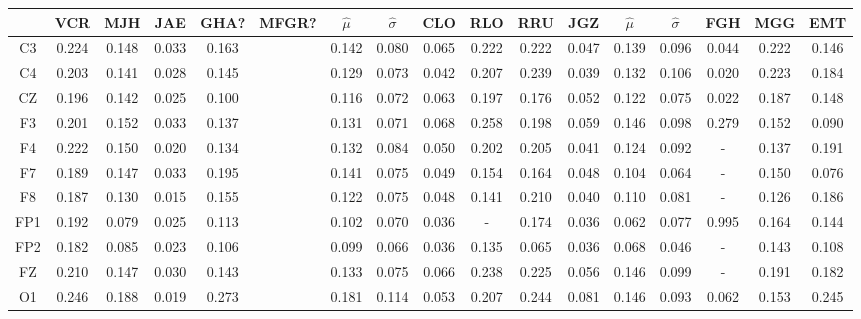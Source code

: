 \begin{SidewaysFigure}
\centering
\begin{tabular}{c||ccccc|cc||cccc|cc||ccc}
& VCR & MJH & JAE & GHA? & MFGR? &$\widehat{\mu}$ & $\widehat{\sigma}$
& CLO & RLO & RRU & JGZ &$\widehat{\mu}$ & $\widehat{\sigma}$
& FGH & MGG & EMT \\
\hline
 C3 & 0.224    & 0.148    & 0.033    & 0.163    && 0.142    & 0.080    & 0.065    & 0.222    & 0.222    & 0.047    & 0.139    & 0.096    & 0.044    & 0.222    & 0.146    \\
 C4 & 0.203    & 0.141    & 0.028    & 0.145    && 0.129    & 0.073    & 0.042    & 0.207    & 0.239    & 0.039    & 0.132    & 0.106    & 0.020    & 0.223    & 0.184    \\
 CZ & 0.196    & 0.142    & 0.025    & 0.100    && 0.116    & 0.072    & 0.063    & 0.197    & 0.176    & 0.052    & 0.122    & 0.075    & 0.022    & 0.187    & 0.148    \\
 F3 & 0.201    & 0.152    & 0.033    & 0.137    && 0.131    & 0.071    & 0.068    & 0.258    & 0.198    & 0.059    & 0.146    & 0.098    & 0.279    & 0.152    & 0.090    \\
 F4 & 0.222    & 0.150    & 0.020    & 0.134    && 0.132    & 0.084    & 0.050    & 0.202    & 0.205    & 0.041    & 0.124    & 0.092    & -      & 0.137    & 0.191    \\
 F7 & 0.189    & 0.147    & 0.033    & 0.195    && 0.141    & 0.075    & 0.049    & 0.154    & 0.164    & 0.048    & 0.104    & 0.064    & -      & 0.150    & 0.076    \\
 F8 & 0.187    & 0.130    & 0.015    & 0.155    && 0.122    & 0.075    & 0.048    & 0.141    & 0.210    & 0.040    & 0.110    & 0.081    & -      & 0.126    & 0.186    \\
 FP1 & 0.192    & 0.079    & 0.025    & 0.113    && 0.102    & 0.070    & 0.036    & -      & 0.174    & 0.036    & 0.062    & 0.077    & 0.995    & 0.164    & 0.144    \\
 FP2 & 0.182    & 0.085    & 0.023    & 0.106    && 0.099    & 0.066    & 0.036    & 0.135    & 0.065    & 0.036    & 0.068    & 0.046    & -      & 0.143    & 0.108    \\
 FZ & 0.210    & 0.147    & 0.030    & 0.143    && 0.133    & 0.075    & 0.066    & 0.238    & 0.225    & 0.056    & 0.146    & 0.099    & -      & 0.191    & 0.182    \\
 O1 & 0.246    & 0.188    & 0.019    & 0.273    && 0.181    & 0.114    & 0.053    & 0.207    & 0.244    & 0.081    & 0.146    & 0.093    & 0.062    & 0.153    & 0.245    \\

\end{tabular}
\end{SidewaysFigure}
